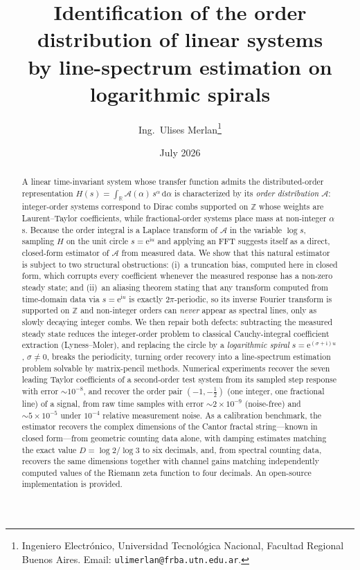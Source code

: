 \documentclass[11pt, a4paper]{article}
\title{Identification of the order distribution of linear systems\\
by line-spectrum estimation on logarithmic spirals}
\author{Ing.\ Ulises Merlan\thanks{Ingeniero Electr\'onico, Universidad
Tecnol\'ogica Nacional, Facultad Regional Buenos Aires. Email:
\texttt{ulimerlan@frba.utn.edu.ar}.}}
\date{July 2026}
\theoremstyle{definition}
\theoremstyle{remark}
\newcommand{\R}{\mathbb{R}}
\newcommand{\Z}{\mathbb{Z}}
\newcommand{\dd}{\,\mathrm{d}}
\newcommand{\ii}{\mathrm{i}}
\newcommand{\ee}{\mathrm{e}}
\begin{document}
\maketitle

\begin{abstract}
A linear time-invariant system whose transfer function admits the
distributed-order representation $H(s)=\int_\R \mathcal{A}(\alpha)\,
s^{\alpha} \dd\alpha$ is characterized by its \emph{order distribution}
$\mathcal{A}$: integer-order systems correspond to Dirac combs supported on
$\Z$ whose weights are Laurent--Taylor coefficients, while fractional-order
systems place mass at non-integer $\alpha$s. Because the order integral is a
Laplace transform of $\mathcal{A}$ in the variable $\log s$, sampling $H$ on
the unit circle $s=\ee^{\ii u}$ and applying an FFT suggests itself as a
direct, closed-form estimator of $\mathcal{A}$ from measured data. We show
that this natural estimator is subject to two structural obstructions:
(i)~a truncation bias, computed here in closed form, which corrupts every
coefficient whenever the measured response has a non-zero steady state; and
(ii)~an aliasing theorem stating that any transform computed from time-domain
data via $s=\ee^{\ii u}$ is exactly $2\pi$-periodic, so its inverse Fourier
transform is supported on $\Z$ and non-integer orders can \emph{never} appear
as spectral lines, only as slowly decaying integer combs. We then repair
both defects: subtracting the measured steady state reduces the integer-order
problem to classical Cauchy-integral coefficient extraction
(Lyness--Moler), and replacing the circle by a \emph{logarithmic spiral}
$s=\ee^{(\sigma+\ii)u}$, $\sigma\neq0$, breaks the periodicity, turning
order recovery into a line-spectrum estimation problem solvable by
matrix-pencil methods. Numerical experiments recover the seven leading
Taylor coefficients of a second-order test system from its sampled step
response with error ${\sim}10^{-8}$, and recover the order pair
$(-1,-\tfrac12)$ (one integer, one fractional line) of a signal, from raw
time samples with error ${\sim}2\times10^{-9}$ (noise-free) and
${\sim}5\times10^{-5}$ under $10^{-4}$ relative measurement noise. As a
calibration benchmark, the estimator recovers the complex dimensions of
the Cantor fractal string---known in closed form---from geometric
counting data alone, with damping estimates matching the exact value
$D=\log2/\log3$ to six decimals, and, from spectral counting data,
recovers the same dimensions together with channel gains matching
independently computed values of the Riemann zeta function to four
decimals. An open-source implementation is provided.
\end{abstract}
\end{document}
